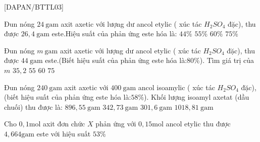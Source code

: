 [DAPAN/BTTL03]


\begin{ex}
	Đun nóng  $ 24~\mathrm{gam} $ axit axetic với lượng dư ancol etylic ( xúc tác $ H_2SO_4 $ đặc), thu được $ 26,4~\mathrm{gam} $ este.Hiệu suất của phản ứng este hóa là:
	\choice
{%
	$ 44 \% $
}
{%
	$ 55 \% $
}
{%
	$ 60 \% $
}
{%
\True	$ 75 \% $
}
\sodongkeex[4]
	\loigiai
	{%
		
}
\end{ex}
\begin{ex}
	Đun nóng  $ m~\mathrm{gam} $ axit axetic với lượng dư ancol etylic ( xúc tác $ H_2SO_4 $ đặc), thu được $ 44~\mathrm{gam} $ este.(Biết hiệu suất của phản ứng este hóa là:$ 80 \% $). Tìm giá trị của $ m $
	\choice
	{%
		$ 35,2  $
	}
	{%
		\True $ 55  $
	}
	{%
		$ 60  $
	}
	{%
		$ 75  $
	}
	\sodongkeex[4]
	\loigiai
	{%
		
	}
\end{ex}
\begin{ex}
	Đun nóng  $ 240~\mathrm{gam} $ axit axetic với $ 400~\mathrm{gam} $ ancol isoamylic  ( xúc tác $ H_2SO_4 $ đặc),(biết hiệu suất của phản ứng este hóa là:$ 58 \% $). Khối lượng isoamyl axetat (dầu chuối) thu được là:
	\choice
	{%
		$ 896,55 ~\mathrm{gam}  $
	}
	{%
		$ 342,73 ~\mathrm{gam} $
	}
	{%
		\True $ 301,6 ~\mathrm{gam} $
	}
	{%
		$ 1018,81 ~\mathrm{gam} $
	}
	\sodongkeex[4]
	\loigiai
	{%
		
	}
\end{ex}
\begin{ex}
	Cho $ 0,1\mathrm{mol} $ axit đơn chức $ X $ phản ứng với $ 0,15\mathrm{mol} $ ancol etylic thu được $ 4,664\mathrm{gam} $ este với hiệu suất $ 53 \% $
	\choice
	{%
	}
	{%
	}
	{%
		\True {}
	}
	{%
	}
	\sodongkeex[4]
	\loigiai
	{%
		
	}
\end{ex}
